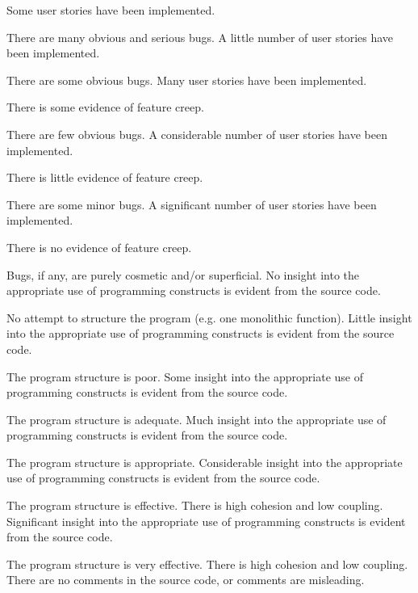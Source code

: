 \documentclass{../fal_assignment}
\begin{document}
\begin{markingrubric}
        \grade Some user stories have been implemented.
            \par There are many obvious and serious bugs.
        \grade A little number of user stories have been implemented.
            \par There are some obvious bugs.
        \grade Many user stories have been implemented.
            \par There is some evidence of feature creep.
            \par There are few obvious bugs.
        \grade A considerable number of user stories have been implemented.
            \par There is little evidence of feature creep.
            \par There are some minor bugs.
        \grade A significant number of user stories have been implemented.
            \par There is no evidence of feature creep.
            \par Bugs, if any, are purely cosmetic and/or superficial.
%
        \grade\fail No insight into the appropriate use of programming constructs is evident from the source code.
            \par No attempt to structure the program (e.g. one monolithic function).
        \grade Little insight into the appropriate use of programming constructs is evident from the source code.
            \par The program structure is poor.
        \grade Some insight into the appropriate use of programming constructs is evident from the source code.
            \par The program structure is adequate.
        \grade Much insight into the appropriate use of programming constructs is evident from the source code.
            \par The program structure is appropriate.
        \grade Considerable insight into the appropriate use of programming constructs is evident from the source code.
            \par The program structure is effective. There is high cohesion and low coupling.
        \grade Significant insight into the appropriate use of programming constructs is evident from the source code.
            \par The program structure is very effective. There is high cohesion and low coupling.
%
        \grade\fail There are no comments in the source code, or comments are misleading.

\end{markingrubric}
\end{document}
